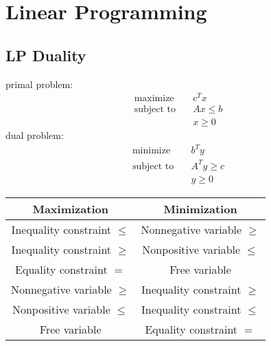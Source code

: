 \chapter{Linear Programming}

\section{LP Duality}

primal problem:
\[\begin{aligned}
\text{maximize} \quad & c^T x \\
\text{subject to} \quad & Ax \le b \\
& x \ge 0
\end{aligned}\]
dual problem:
\[\begin{aligned}
\text{minimize} \quad & b^T y \\
\text{subject to} \quad & A^T y \ge c \\
& y \ge 0
\end{aligned}\]

\begin{center}
\begin{tabular}{c|c}
Maximization & Minimization \\
\hline
Inequality constraint $\le$ & Nonnegative variable $\ge$ \\
Inequality constraint $\ge$ & Nonpositive variable $\le$ \\
Equality constraint $=$ & Free variable \\
Nonnegative variable $\ge$ & Inequality constraint $\ge$ \\
Nonpositive variable $\le$ & Inequality constraint $\le$ \\
Free variable & Equality constraint $=$ \\
\end{tabular}
\end{center}

